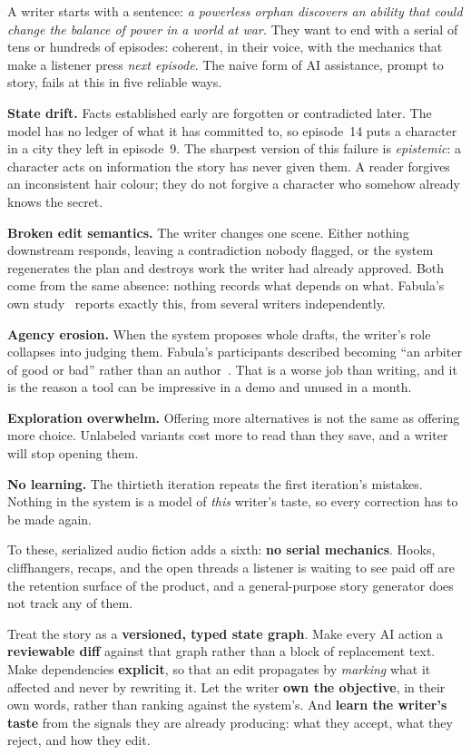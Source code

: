 \documentclass{article}
\begin{document}
A writer starts with a sentence: \emph{a powerless orphan discovers an ability that
could change the balance of power in a world at war.} They want to end with a serial of tens or
hundreds of episodes: coherent, in their voice, with the mechanics that make a listener
press \emph{next episode}. The naive form of AI assistance, prompt to story,
fails at this in five reliable ways.

\textbf{State drift.} Facts established early are forgotten or contradicted later. The
model has no ledger of what it has committed to, so episode~14 puts a character in a
city they left in episode~9. The sharpest version of this failure is
\emph{epistemic}: a character acts on information the story has never given them. A
reader forgives an inconsistent hair colour; they do not forgive a character who
somehow already knows the secret.

\textbf{Broken edit semantics.} The writer changes one scene. Either nothing downstream
responds, leaving a contradiction nobody flagged, or the system regenerates the plan and
destroys work the writer had already approved. Both come from
the same absence: nothing records what depends on what. Fabula's own study~\cite{mirowski2026fabula} reports
exactly this, from several writers independently.

\textbf{Agency erosion.} When the system proposes whole drafts, the writer's role
collapses into judging them. Fabula's participants described becoming ``an arbiter of
good or bad'' rather than an author~\cite{mirowski2026fabula}. That is a worse job than writing, and it is the
reason a tool can be impressive in a demo and unused in a month.

\textbf{Exploration overwhelm.} Offering more alternatives is not the same as offering
more choice. Unlabeled variants cost more to read than they save, and a writer will
stop opening them.

\textbf{No learning.} The thirtieth iteration repeats the first iteration's mistakes.
Nothing in the system is a model of \emph{this} writer's taste, so every correction has
to be made again.

To these, serialized audio fiction adds a sixth: \textbf{no serial mechanics}. Hooks,
cliffhangers, recaps, and the open threads a listener is waiting to see paid off are the
retention surface of the product, and a general-purpose story generator does not track
any of them.


Treat the story as a \textbf{versioned, typed state graph}. Make every AI action a
\textbf{reviewable diff} against that graph rather than a block of replacement text.
Make dependencies \textbf{explicit}, so that an edit propagates by \emph{marking} what it
affected and never by rewriting it. Let the writer \textbf{own the objective}, in their
own words, rather than ranking against the system's. And \textbf{learn the writer's
taste} from the signals they are already producing: what they accept, what they reject,
and how they edit.
\end{document}
